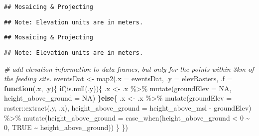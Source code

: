 \documentclass[
]{article}
\newenvironment{Shaded}{\begin{snugshade}}{\end{snugshade}}
\newcommand{\AttributeTok}[1]{\textcolor[rgb]{0.77,0.63,0.00}{#1}}
\newcommand{\CommentTok}[1]{\textcolor[rgb]{0.56,0.35,0.01}{\textit{#1}}}
\newcommand{\ConstantTok}[1]{\textcolor[rgb]{0.00,0.00,0.00}{#1}}
\newcommand{\ControlFlowTok}[1]{\textcolor[rgb]{0.13,0.29,0.53}{\textbf{#1}}}
\newcommand{\DecValTok}[1]{\textcolor[rgb]{0.00,0.00,0.81}{#1}}
\newcommand{\FunctionTok}[1]{\textcolor[rgb]{0.00,0.00,0.00}{#1}}
\newcommand{\NormalTok}[1]{#1}
\newcommand{\OtherTok}[1]{\textcolor[rgb]{0.56,0.35,0.01}{#1}}
\newcommand{\SpecialCharTok}[1]{\textcolor[rgb]{0.00,0.00,0.00}{#1}}
\begin{document}
\begin{verbatim}
## Mosaicing & Projecting
\end{verbatim}

\begin{verbatim}
## Note: Elevation units are in meters.
\end{verbatim}

\begin{verbatim}
## Mosaicing & Projecting
\end{verbatim}

\begin{verbatim}
## Note: Elevation units are in meters.
\end{verbatim}

\begin{Shaded}
\begin{Highlighting}[]
\CommentTok{\# add elevation information to data frames, but only for the points within 3km of the feeding site.}
\NormalTok{eventsDat }\OtherTok{\textless{}{-}} \FunctionTok{map2}\NormalTok{(}\AttributeTok{.x =}\NormalTok{ eventsDat, }\AttributeTok{.y =}\NormalTok{ elevRasters, }\AttributeTok{.f =} \ControlFlowTok{function}\NormalTok{(.x, .y)\{}
  \ControlFlowTok{if}\NormalTok{(}\FunctionTok{is.null}\NormalTok{(.y))\{}
\NormalTok{    .x }\OtherTok{\textless{}{-}}\NormalTok{ .x }\SpecialCharTok{\%\textgreater{}\%}
      \FunctionTok{mutate}\NormalTok{(}\AttributeTok{groundElev =} \ConstantTok{NA}\NormalTok{,}
             \AttributeTok{height\_above\_ground =} \ConstantTok{NA}\NormalTok{)}
\NormalTok{  \}}\ControlFlowTok{else}\NormalTok{\{}
\NormalTok{    .x }\OtherTok{\textless{}{-}}\NormalTok{ .x }\SpecialCharTok{\%\textgreater{}\%}
      \FunctionTok{mutate}\NormalTok{(}\AttributeTok{groundElev =}\NormalTok{ raster}\SpecialCharTok{::}\FunctionTok{extract}\NormalTok{(.y, .x),}
             \AttributeTok{height\_above\_ground =}\NormalTok{ height\_above\_msl }\SpecialCharTok{{-}}\NormalTok{ groundElev) }\SpecialCharTok{\%\textgreater{}\%}
      \FunctionTok{mutate}\NormalTok{(}\AttributeTok{height\_above\_ground =} \FunctionTok{case\_when}\NormalTok{(height\_above\_ground }\SpecialCharTok{\textless{}} \DecValTok{0} \SpecialCharTok{\textasciitilde{}} \DecValTok{0}\NormalTok{,}
                                             \ConstantTok{TRUE} \SpecialCharTok{\textasciitilde{}}\NormalTok{ height\_above\_ground))}
\NormalTok{  \}}
\NormalTok{\})}


\end{Highlighting}
\end{Shaded}
\end{document}
